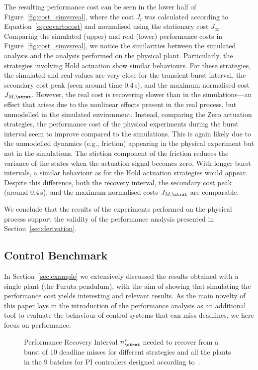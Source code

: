 The resulting performance cost can be seen in the lower half of Figure~\ref{fig:cost_simvsreal}, where the cost $J_t$ was calculated according to Equation~\eqref{eq:covartocost} and normalised using the stationary cost $J_\infty$. 
Comparing the simulated (upper) and real (lower) performance costs in Figure~\ref{fig:cost_simvsreal}, we notice the similarities between the simulated analysis and the analysis performed on the physical plant. 
%
Particularly, the strategies involving Hold actuation show similar behaviours. 
For these strategies, the simulated and real values are very close for the transient burst interval, the secondary cost peak (seen around time $0.4\,$s), and the maximum normalised cost $J_{M, \strat}$.
However, the real cost is recovering slower than in the simulations---an effect that arises due to the nonlinear effects present in the real process, but unmodelled in the simulated environment.
%
Instead, comparing the Zero actuation strategies, the performance cost of the physical experiments during the burst interval seem to improve compared to the simulations.
This is again likely due to the unmodelled dynamics (e.g., friction) appearing in the physical experiment but not in the simulations.
The stiction component of the friction reduces the variance of the states when the actuation signal becomes zero.
With longer burst intervals, a similar behaviour as for the Hold actuation strategies would appear.
Despite this difference, both the recovery interval, the secondary cost peak (around $0.4\,$s), and the maximum normalised costs $J_{M,\strat}$ are comparable.

We conclude that the results of the experiments performed on the physical process support the validity of the performance analysis presented in Section~\ref{sec:derivation}.

\subsection{Control Benchmark}
\label{sec:aggregateresults}

In Section~\ref{sec:example} we extensively discussed the results obtained with a single plant (the Furuta pendulum), with the aim of showing that simulating the performance cost yields interesting and relevant results.
As the main novelty of this paper lays in the introduction of the performance analysis as an additional tool to evaluate the behaviour of control systems that can miss deadlines, we here focus on performance.

\begin{figure}[t]
    \centering
    \resizebox{0.95\textwidth}{!}{}
    \caption{Performance Recovery Interval $\recoverylengthinterval_{\strat}$ needed to recover from a burst of 10 deadline misses for different strategies and all the plants in the 9 batches for PI controllers designed according to~\cite{Garpinger:2015}.}
    \label{fig:overview10}
\end{figure}
\afterpage{\clearpage}

